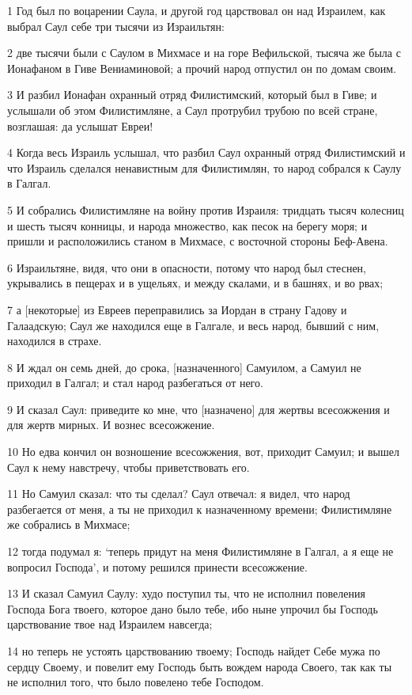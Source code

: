 \par 1 Год был по воцарении Саула, и другой год царствовал он над Израилем, как выбрал Саул себе три тысячи из Израильтян:
\par 2 две тысячи были с Саулом в Михмасе и на горе Вефильской, тысяча же была с Ионафаном в Гиве Вениаминовой; а прочий народ отпустил он по домам своим.
\par 3 И разбил Ионафан охранный отряд Филистимский, который был в Гиве; и услышали об этом Филистимляне, а Саул протрубил трубою по всей стране, возглашая: да услышат Евреи!
\par 4 Когда весь Израиль услышал, что разбил Саул охранный отряд Филистимский и что Израиль сделался ненавистным для Филистимлян, то народ собрался к Саулу в Галгал.
\par 5 И собрались Филистимляне на войну против Израиля: тридцать тысяч колесниц и шесть тысяч конницы, и народа множество, как песок на берегу моря; и пришли и расположились станом в Михмасе, с восточной стороны Беф-Авена.
\par 6 Израильтяне, видя, что они в опасности, потому что народ был стеснен, укрывались в пещерах и в ущельях, и между скалами, и в башнях, и во рвах;
\par 7 а [некоторые] из Евреев переправились за Иордан в страну Гадову и Галаадскую; Саул же находился еще в Галгале, и весь народ, бывший с ним, находился в страхе.
\par 8 И ждал он семь дней, до срока, [назначенного] Самуилом, а Самуил не приходил в Галгал; и стал народ разбегаться от него.
\par 9 И сказал Саул: приведите ко мне, что [назначено] для жертвы всесожжения и для жертв мирных. И вознес всесожжение.
\par 10 Но едва кончил он возношение всесожжения, вот, приходит Самуил; и вышел Саул к нему навстречу, чтобы приветствовать его.
\par 11 Но Самуил сказал: что ты сделал? Саул отвечал: я видел, что народ разбегается от меня, а ты не приходил к назначенному времени; Филистимляне же собрались в Михмасе;
\par 12 тогда подумал я: `теперь придут на меня Филистимляне в Галгал, а я еще не вопросил Господа', и потому решился принести всесожжение.
\par 13 И сказал Самуил Саулу: худо поступил ты, что не исполнил повеления Господа Бога твоего, которое дано было тебе, ибо ныне упрочил бы Господь царствование твое над Израилем навсегда;
\par 14 но теперь не устоять царствованию твоему; Господь найдет Себе мужа по сердцу Своему, и повелит ему Господь быть вождем народа Своего, так как ты не исполнил того, что было повелено тебе Господом.
